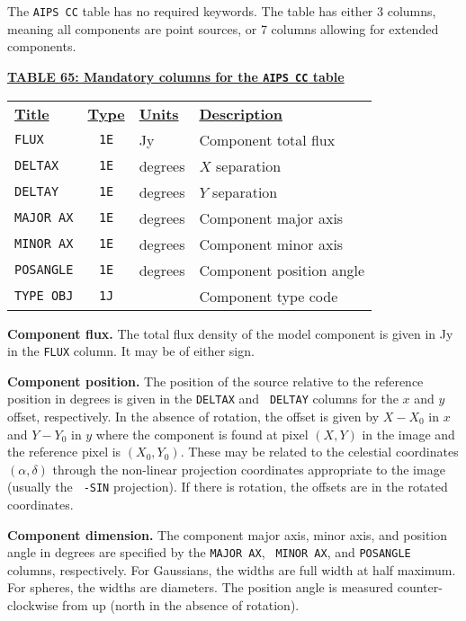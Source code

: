\documentclass[twoside]{article}
\newcommand{\Hi}[1]{\textcolor{hicol}{#1}}
\begin{document}
The {\tt AIPS CC} table has no required keywords.  The table has
either 3 columns, meaning all components are point sources, or 7
columns allowing for extended components.

\vfill\eject
\begin{center}
\underline{\bf{TABLE 65: Mandatory columns for the {\tt AIPS CC} table}}\\
\begin{tabular}{lcll}
\noalign{\vspace{2pt}} \label{ta:CCcols}
\underline{{\bf Title\vphantom{y}}} & \underline{\bf{Type}} &
   \underline{{\bf Units\vphantom{y}}} & \underline{\bf{Description}} \\
\noalign{\vspace{2pt}}
{\tt FLUX}     & {\tt 1E} & Jy      & Component total flux \\
{\tt DELTAX}   & {\tt 1E} & degrees & $X$ separation \\
{\tt DELTAY}   & {\tt 1E} & degrees & $Y$ separation \\
\hline
{\tt MAJOR AX} & {\tt 1E} & degrees & Component major axis \\
{\tt MINOR AX} & {\tt 1E} & degrees & Component minor axis \\
{\tt POSANGLE} & {\tt 1E} & degrees & Component position angle \\
{\tt TYPE OBJ} & {\tt 1J} &         & Component type code
\end{tabular}
\end{center}

{\bf Component flux.}  The total flux density of the model component
is given in Jy in the {\tt FLUX} column.  It may be of either sign.

{\bf Component position.} The position of the source relative to the
reference position in degrees is given in the {\tt DELTAX} and {\tt
  DELTAY} columns for the $x$ and $y$ offset, respectively.  In the
absence of rotation, the offset is given by \Hi{$X - X_0$ in $x$ and
$Y-Y_0$ in $y$ where the component is found at pixel $(X,Y)$ in the
image and the reference pixel is $(X_0,Y_0)$\@.  These may be related
to the celestial coordinates $(\alpha,\delta)$ through the non-linear
projection coordinates appropriate to the image (usually the {\tt
-SIN} projection).}  If there is rotation, the offsets are in the
rotated coordinates.

{\bf Component dimension.} The component major axis, minor axis, and
position angle in degrees are specified by the {\tt MAJOR AX}, {\tt
  MINOR AX}, and {\tt POSANGLE} columns, respectively.  For Gaussians,
the widths are full width at half maximum.  For spheres, the widths
are diameters.  The position angle is measured counter-clockwise from
up (north in the absence of rotation).
\end{document}
